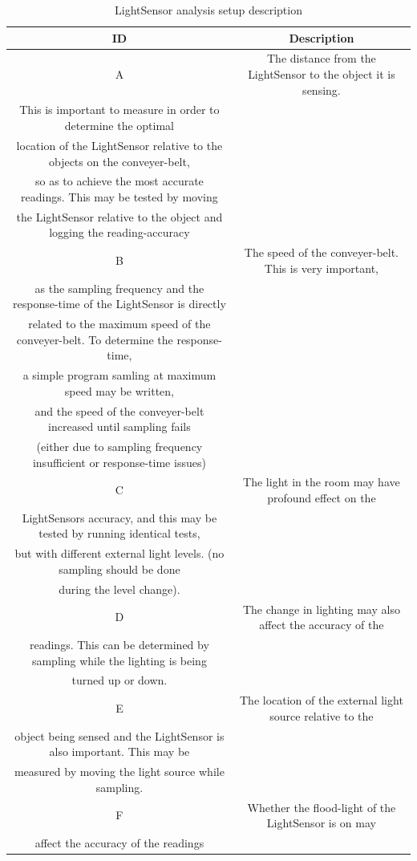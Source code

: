 \documentclass[11pt,a4]{article}
\begin{document}
\begin{table}[ht]
\caption{LightSensor analysis setup description}
\centering
\begin{tabular}{c c}
\hline\hline
ID & Description \\ [0.5ex]
\hline
A & The distance from the LightSensor to the object it is sensing. \\* This is important to measure in order to determine the optimal \\* location of the LightSensor relative to the objects on the conveyer-belt, \\* so as to achieve the most accurate readings. This may be tested by moving \\* the LightSensor relative to the object and logging the reading-accuracy \\
B & The speed of the conveyer-belt. This is very important, \\* as the sampling frequency and the response-time of the LightSensor is directly\\* related to the maximum speed of the conveyer-belt. To determine the response-time,\\* a simple program samling at maximum speed may be written,\\* and the speed of the conveyer-belt increased until sampling fails \\* (either due to sampling frequency insufficient or response-time issues) \\
C & The light in the room may have profound effect on the \\* LightSensors accuracy, and this may be tested by running identical tests, \\* but with different external light levels. (no sampling should be done \\* during the level change). \\
D & The change in lighting may also affect the accuracy of the \\* readings. This can be determined by sampling while the lighting is being \\* turned up or down. \\
E & The location of the external light source relative to the \\* object being sensed and the LightSensor is also important. This may be \\* measured by moving the light source while sampling. \\
F & Whether the flood-light of the LightSensor is on may \\* affect the accuracy of the readings \\

\end{tabular}
\end{table}
\end{document}
